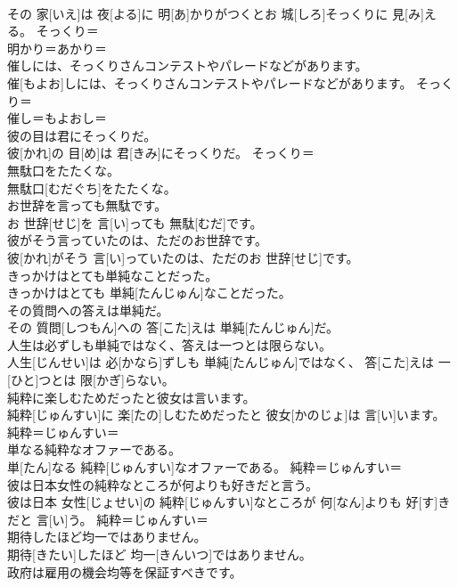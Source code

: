 \documentclass[8pt]{extreport}
\begin{document}
\begin{CJK}{UTF8}{min}
\\	その 家[いえ]は 夜[よる]に 明[あ]かりがつくとお 城[しろ]そっくりに 見[み]える。	そっくり＝ 
\\	明かり＝あかり＝ 
\\	催しには、そっくりさんコンテストやパレードなどがあります。	
\\	催[もよお]しには、そっくりさんコンテストやパレードなどがあります。	そっくり＝ 
\\	催し＝もよおし＝ 
\\	彼の目は君にそっくりだ。	
\\	彼[かれ]の 目[め]は 君[きみ]にそっくりだ。	そっくり＝ 
\\	無駄口をたたくな。	
\\	無駄口[むだぐち]をたたくな。	
\\	お世辞を言っても無駄です。	
\\	お 世辞[せじ]を 言[い]っても 無駄[むだ]です。	
\\	彼がそう言っていたのは、ただのお世辞です。	
\\	彼[かれ]がそう 言[い]っていたのは、ただのお 世辞[せじ]です。	
\\	きっかけはとても単純なことだった。	
\\	きっかけはとても 単純[たんじゅん]なことだった。	
\\	その質問への答えは単純だ。	
\\	その 質問[しつもん]への 答[こた]えは 単純[たんじゅん]だ。	
\\	人生は必ずしも単純ではなく、答えは一つとは限らない。	
\\	人生[じんせい]は 必[かなら]ずしも 単純[たんじゅん]ではなく、 答[こた]えは 一[ひと]つとは 限[かぎ]らない。	
\\	純粋に楽しむためだったと彼女は言います。	
\\	純粋[じゅんすい]に 楽[たの]しむためだったと 彼女[かのじょ]は 言[い]います。	純粋＝じゅんすい＝ 
\\	単なる純粋なオファーである。	
\\	単[たん]なる 純粋[じゅんすい]なオファーである。	純粋＝じゅんすい＝ 
\\	彼は日本女性の純粋なところが何よりも好きだと言う。	
\\	彼は日本 女性[じょせい]の 純粋[じゅんすい]なところが 何[なん]よりも 好[す]きだと 言[い]う。	純粋＝じゅんすい＝ 
\\	期待したほど均一ではありません。	
\\	期待[きたい]したほど 均一[きんいつ]ではありません。	
\\	政府は雇用の機会均等を保証すべきです。	

\end{CJK}
\end{document}

